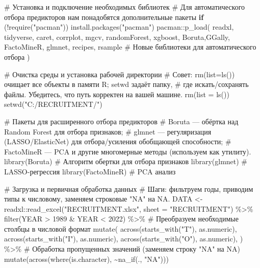 \documentclass[
  letterpaper,
  DIV=11,
  numbers=noendperiod]{scrreprt}
\newenvironment{Shaded}{\begin{snugshade}}{\end{snugshade}}
\newcommand{\AttributeTok}[1]{\textcolor[rgb]{0.40,0.45,0.13}{#1}}
\newcommand{\CommentTok}[1]{\textcolor[rgb]{0.37,0.37,0.37}{#1}}
\newcommand{\ControlFlowTok}[1]{\textcolor[rgb]{0.00,0.23,0.31}{\textbf{#1}}}
\newcommand{\DecValTok}[1]{\textcolor[rgb]{0.68,0.00,0.00}{#1}}
\newcommand{\FunctionTok}[1]{\textcolor[rgb]{0.28,0.35,0.67}{#1}}
\newcommand{\NormalTok}[1]{\textcolor[rgb]{0.00,0.23,0.31}{#1}}
\newcommand{\OtherTok}[1]{\textcolor[rgb]{0.00,0.23,0.31}{#1}}
\newcommand{\SpecialCharTok}[1]{\textcolor[rgb]{0.37,0.37,0.37}{#1}}
\newcommand{\StringTok}[1]{\textcolor[rgb]{0.13,0.47,0.30}{#1}}
\begin{document}
\begin{Shaded}
\begin{Highlighting}[]
\CommentTok{\# Установка и подключение необходимых библиотек}
\CommentTok{\# Для автоматического отбора предикторов нам понадобятся дополнительные пакеты}
\ControlFlowTok{if}\NormalTok{ (}\SpecialCharTok{!}\FunctionTok{require}\NormalTok{(}\StringTok{"pacman"}\NormalTok{)) }\FunctionTok{install.packages}\NormalTok{(}\StringTok{"pacman"}\NormalTok{)}
\NormalTok{pacman}\SpecialCharTok{::}\FunctionTok{p\_load}\NormalTok{(}
\NormalTok{  readxl, tidyverse, caret, corrplot, mgcv, randomForest, xgboost,}
\NormalTok{  Boruta,GGally, FactoMineR, glmnet, recipes, rsample  }\CommentTok{\# Новые библиотеки для автоматического отбора}
\NormalTok{)}

\CommentTok{\# Очистка среды и установка рабочей директории}
\CommentTok{\# Совет: rm(list=ls()) очищает все объекты в памяти R; setwd задаёт папку,}
\CommentTok{\# где искать/сохранять файлы. Убедитесь, что путь корректен на вашей машине.}
\FunctionTok{rm}\NormalTok{(}\AttributeTok{list =} \FunctionTok{ls}\NormalTok{())}
\FunctionTok{setwd}\NormalTok{(}\StringTok{"C:/RECRUITMENT/"}\NormalTok{)}

\CommentTok{\# Пакеты для расширенного отбора предикторов}
\CommentTok{\# Boruta — обёртка над Random Forest для отбора признаков;}
\CommentTok{\# glmnet — регуляризация (LASSO/ElasticNet) для отбора/усиления обобщающей способности;}
\CommentTok{\# FactoMineR — PCA и другие многомерные методы (используем как утилиту).}
\FunctionTok{library}\NormalTok{(Boruta)   }\CommentTok{\# Алгоритм обертки для отбора признаков}
\FunctionTok{library}\NormalTok{(glmnet)   }\CommentTok{\# LASSO{-}регрессия}
\FunctionTok{library}\NormalTok{(FactoMineR) }\CommentTok{\# PCA анализ}


\CommentTok{\# Загрузка и первичная обработка данных}
\CommentTok{\# Шаги: фильтруем годы, приводим типы к числовому, заменяем строковые "NA" на NA.}
\NormalTok{DATA }\OtherTok{\textless{}{-}}\NormalTok{ readxl}\SpecialCharTok{::}\FunctionTok{read\_excel}\NormalTok{(}\StringTok{"RECRUITMENT.xlsx"}\NormalTok{, }\AttributeTok{sheet =} \StringTok{"RECRUITMENT"}\NormalTok{) }\SpecialCharTok{\%\textgreater{}\%}
  \FunctionTok{filter}\NormalTok{(YEAR }\SpecialCharTok{\textgreater{}} \DecValTok{1989} \SpecialCharTok{\&}\NormalTok{ YEAR }\SpecialCharTok{\textless{}} \DecValTok{2022}\NormalTok{) }\SpecialCharTok{\%\textgreater{}\%}
  \CommentTok{\# Преобразуем необходимые столбцы в числовой формат}
  \FunctionTok{mutate}\NormalTok{(}
    \FunctionTok{across}\NormalTok{(}\FunctionTok{starts\_with}\NormalTok{(}\StringTok{"T"}\NormalTok{), as.numeric),}
    \FunctionTok{across}\NormalTok{(}\FunctionTok{starts\_with}\NormalTok{(}\StringTok{"I"}\NormalTok{), as.numeric),}
    \FunctionTok{across}\NormalTok{(}\FunctionTok{starts\_with}\NormalTok{(}\StringTok{"O"}\NormalTok{), as.numeric),}
\NormalTok{  ) }\SpecialCharTok{\%\textgreater{}\%}
  \CommentTok{\# Обработка пропущенных значений (заменяем строку "NA" на NA)}
  \FunctionTok{mutate}\NormalTok{(}\FunctionTok{across}\NormalTok{(}\FunctionTok{where}\NormalTok{(is.character), }\SpecialCharTok{\textasciitilde{}}\FunctionTok{na\_if}\NormalTok{(., }\StringTok{"NA"}\NormalTok{)))}


\end{Highlighting}
\end{Shaded}
\end{document}
